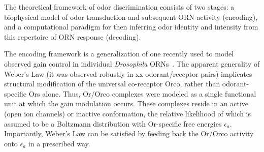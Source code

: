 The theoretical framework of odor discrimination consists of two stages: a biophysical model of odor transduction and subsequent ORN activity (encoding), and a computational paradigm for then inferring odor identity and intensity from this repertoire of ORN response (decoding).

The encoding framework is a generalization of one recently used to model observed gain control in individual \textit{Drosophila} ORNs~\cite{srinivas_elife}. The apparent generality of Weber's Law (it was observed robustly in xx odorant/receptor pairs) implicates structural modification of the universal co-receptor Orco, rather than odorant-specific Ors alone. Thus, Or/Orco complexes were modeled as a single functional unit at which the gain modulation occurs. These complexes reside in an active (open ion channels) or inactive conformation, the relative likelihood of which is assumed to be a Boltzmann distribution with Or-specific free energies $\epsilon_a$. Importantly, Weber's Law can be satisfied by feeding back the Or/Orco activity onto $\epsilon_a$ in a prescribed way. 

